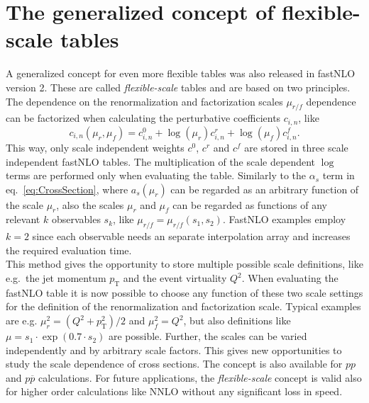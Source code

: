 \documentclass{DISproc}
\begin{document}


\section{The generalized concept of flexible-scale tables}

A generalized concept for even more flexible tables was also released in fastNLO version 2.
These are called \emph{flexible-scale} tables and are based on two principles.\\
The dependence on the renormalization and factorization scales $\mu_{r/f}$ dependence can be factorized when calculating the perturbative coefficients $c_{i,n}$, like
\begin{equation}\label{eq:ScaleIndependentWeights}
  c_{i,n}(\mu_r,\mu_f) = c_{i,n}^0 + \log(\mu_r)c_{i,n}^r +  \log(\mu_f) c_{i,n}^f.
\end{equation}
This way, only scale independent weights $c^0$, $c^r$ and $c^f$ are stored in three scale independent fastNLO tables.
The multiplication of the scale dependent $\log$ terms are performed only when evaluating the table.
Similarly to the $\alpha_s$ term in eq.\ \ref{eq:CrossSection}, where $a_s(\mu_r)$ can be regarded as an arbitrary function of the scale $\mu_r$, also the scales $\mu_r$ and $\mu_f$ can be regarded as functions of any relevant $k$ observables $s_k$, like $\mu_{r/f} = \mu_{r/f}(s_1,s_2)$.
FastNLO examples employ $k=2$ since each observable needs an separate interpolation array and increases the required evaluation time.\\
This method gives the opportunity to store multiple possible scale definitions, like e.g.\ the jet momentum $p_\mathrm{T}$ and the event virtuality $Q^2$.
When evaluating the fastNLO table it is now possible to choose any function of these two scale settings for the definition of the renormalization and factorization scale. Typical examples are e.g. $\mu_r^2 = (Q^2+p^2_\mathrm{T})/2$ and $\mu_f^2 = Q^2$, but also definitions like $\mu = s_1 \cdot \exp(0.7 \cdot s_2)$ are possible.
Further, the scales can be varied independently and by arbitrary scale factors.
This gives new opportunities to study the scale dependence of cross sections.
The concept is also available for $pp$ and $p\overline{p}$ calculations.
For future applications, the \emph{flexible-scale} concept is valid also for higher order calculations like NNLO without any significant loss in speed.
\end{document}
